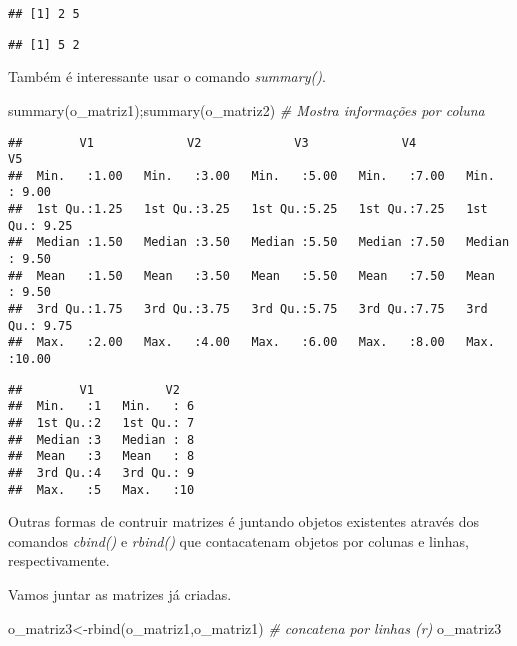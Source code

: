 \documentclass[
]{book}
\newenvironment{Shaded}{\begin{snugshade}}{\end{snugshade}}
\newcommand{\CommentTok}[1]{\textcolor[rgb]{0.56,0.35,0.01}{\textit{#1}}}
\newcommand{\FunctionTok}[1]{\textcolor[rgb]{0.00,0.00,0.00}{#1}}
\newcommand{\NormalTok}[1]{#1}
\newcommand{\OtherTok}[1]{\textcolor[rgb]{0.56,0.35,0.01}{#1}}
\begin{document}
\begin{verbatim}
## [1] 2 5
\end{verbatim}

\begin{verbatim}
## [1] 5 2
\end{verbatim}

Também é interessante usar o comando \emph{summary()}.

\begin{Shaded}
\begin{Highlighting}[]
\FunctionTok{summary}\NormalTok{(o\_matriz1);}\FunctionTok{summary}\NormalTok{(o\_matriz2) }\CommentTok{\# Mostra informações por coluna}
\end{Highlighting}
\end{Shaded}

\begin{verbatim}
##        V1             V2             V3             V4             V5       
##  Min.   :1.00   Min.   :3.00   Min.   :5.00   Min.   :7.00   Min.   : 9.00  
##  1st Qu.:1.25   1st Qu.:3.25   1st Qu.:5.25   1st Qu.:7.25   1st Qu.: 9.25  
##  Median :1.50   Median :3.50   Median :5.50   Median :7.50   Median : 9.50  
##  Mean   :1.50   Mean   :3.50   Mean   :5.50   Mean   :7.50   Mean   : 9.50  
##  3rd Qu.:1.75   3rd Qu.:3.75   3rd Qu.:5.75   3rd Qu.:7.75   3rd Qu.: 9.75  
##  Max.   :2.00   Max.   :4.00   Max.   :6.00   Max.   :8.00   Max.   :10.00
\end{verbatim}

\begin{verbatim}
##        V1          V2    
##  Min.   :1   Min.   : 6  
##  1st Qu.:2   1st Qu.: 7  
##  Median :3   Median : 8  
##  Mean   :3   Mean   : 8  
##  3rd Qu.:4   3rd Qu.: 9  
##  Max.   :5   Max.   :10
\end{verbatim}

Outras formas de contruir matrizes é juntando objetos existentes através dos comandos \emph{cbind()} e \emph{rbind()} que contacatenam objetos por colunas e linhas, respectivamente.

Vamos juntar as matrizes já criadas.

\begin{Shaded}
\begin{Highlighting}[]
\NormalTok{o\_matriz3}\OtherTok{\textless{}{-}}\FunctionTok{rbind}\NormalTok{(o\_matriz1,o\_matriz1) }\CommentTok{\# concatena por linhas (r)}
\NormalTok{o\_matriz3}
\end{Highlighting}
\end{Shaded}
\end{document}
